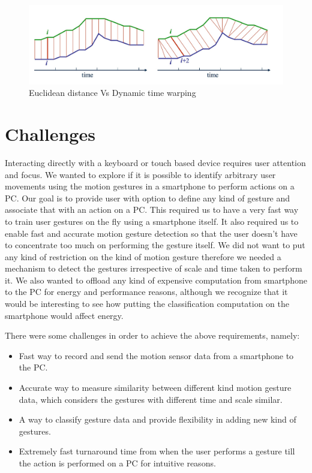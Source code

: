 \documentclass{sigchi}
\begin{document}
\begin{figure}[t]
\centering
\includegraphics[width=1.6\columnwidth]{dtw}
\caption{Euclidean distance Vs Dynamic time warping}
\label{fig:figure4}
\end{figure}

\section{Challenges}

Interacting directly with a keyboard or touch based device requires user attention and focus. We wanted to explore if it is possible to identify arbitrary user movements using the motion gestures in a smartphone to perform actions on a PC. Our goal is to provide user with option to define any kind of gesture and associate that with an action on a PC. This required us to have a very fast way to train user gestures on the fly using a smartphone itself. It also required us to enable fast and accurate motion gesture detection so that the user doesn’t have to concentrate too much on performing the gesture itself. We did not want to put any kind of restriction on the kind of motion gesture therefore we needed a mechanism to detect the gestures irrespective of scale and time taken to perform it. We also wanted to offload any kind of expensive computation from smartphone to the PC for energy and performance reasons, although we recognize that it would be interesting to see how putting the classification computation on the smartphone would affect energy.

There were some challenges in order to achieve the above requirements, namely:
\begin{itemize}
\item Fast way to record and send the motion sensor data from a smartphone to the PC.
\item Accurate way to measure similarity between different kind motion gesture data, which considers the gestures with different time and scale similar.
\item A way to classify gesture data and provide flexibility in adding new kind of gestures.
\item Extremely fast turnaround time from when the user performs a gesture till the action is performed on a PC for intuitive reasons.
\end{itemize}
\end{document}
